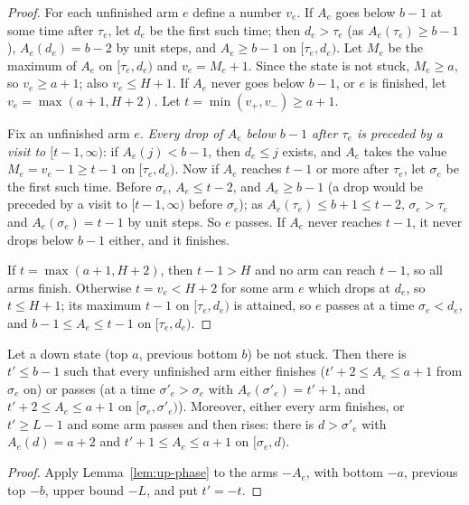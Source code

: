 \begin{proof}
For each unfinished arm $e$ define a number $v_e$. If $A_e$ goes below $b-1$ at some time after $\tau_e$, let $d_e$ be the first
such time; then $d_e>\tau_e$ (as $A_e(\tau_e)\ge b-1$), $A_e(d_e)=b-2$ by unit steps, and $A_e\ge b-1$ on $[\tau_e,d_e)$. Let $M_e$
be the maximum of $A_e$ on $[\tau_e,d_e)$ and $v_e=M_e+1$. Since the state is not stuck, $M_e\ge a$, so $v_e\ge a+1$; also $v_e\le
H+1$. If $A_e$ never goes below $b-1$, or $e$ is finished, let $v_e=\max(a+1,H+2)$. Let $t=\min(v_+,v_-)\ge a+1$.

Fix an unfinished arm $e$. \emph{Every drop of $A_e$ below $b-1$ after $\tau_e$ is preceded by a visit to $[t-1,\infty)$}: if
$A_e(j)<b-1$, then $d_e\le j$ exists, and $A_e$ takes the value $M_e=v_e-1\ge t-1$ on $[\tau_e,d_e)$. Now if $A_e$ reaches $t-1$
or more after $\tau_e$, let $\sigma_e$ be the first such time. Before $\sigma_e$, $A_e\le t-2$, and $A_e\ge b-1$ (a drop would be
preceded by a visit to $[t-1,\infty)$ before $\sigma_e$); as $A_e(\tau_e)\le b+1\le t-2$, $\sigma_e>\tau_e$ and $A_e(\sigma_e)=t-1$ by
unit steps. So $e$ passes. If $A_e$ never reaches $t-1$, it never drops below $b-1$ either, and it finishes.

If $t=\max(a+1,H+2)$, then $t-1>H$ and no arm can reach $t-1$, so all arms finish. Otherwise $t=v_e<H+2$ for some arm $e$ which
drops at $d_e$, so $t\le H+1$; its maximum $t-1$ on $[\tau_e,d_e)$ is attained, so $e$ passes at a time $\sigma_e<d_e$, and
$b-1\le A_e\le t-1$ on $[\tau_e,d_e)$.
\end{proof}


\begin{lemma}\label{lem:down-phase}
Let a down state (top $a$, previous bottom $b$) be not stuck. Then there is $t'\le b-1$ such that every unfinished arm either finishes
($t'+2\le A_e\le a+1$ from $\sigma_e$ on) or passes (at a time $\sigma'_e>\sigma_e$ with $A_e(\sigma'_e)=t'+1$, and $t'+2\le A_e\le a+1$
on $[\sigma_e,\sigma'_e)$). Moreover, either every arm finishes, or $t'\ge L-1$ and some arm passes and then rises: there is
$d>\sigma'_e$ with $A_e(d)=a+2$ and $t'+1\le A_e\le a+1$ on $[\sigma_e,d)$.
\end{lemma}

\begin{proof}
Apply Lemma~\ref{lem:up-phase} to the arms $-A_e$, with bottom $-a$, previous top $-b$, upper bound $-L$, and put $t'=-t$.
\end{proof}

